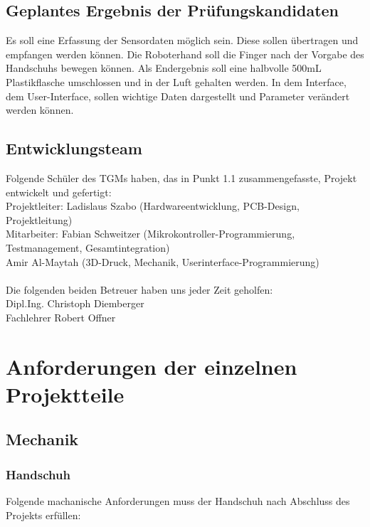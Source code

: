 \documentclass[11pt]{article}
\begin{document}
\subsection{Geplantes Ergebnis der Prüfungskandidaten}
Es soll eine Erfassung der Sensordaten möglich sein. Diese sollen übertragen und empfangen
werden können. Die Roboterhand soll die Finger nach der Vorgabe des Handschuhs bewegen
können. Als Endergebnis soll eine halbvolle 500mL Plastikflasche umschlossen und in der Luft
gehalten werden. In dem Interface, dem User-Interface, sollen wichtige Daten dargestellt und
Parameter verändert werden können.

\subsection{Entwicklungsteam}
Folgende Schüler des TGMs haben, das in Punkt 1.1 zusammengefasste, Projekt entwickelt und gefertigt: \hfill \break
\\
Projektleiter:    Ladislaus Szabo (Hardwareentwicklung, PCB-Design, Projektleitung)\\
Mitarbeiter: Fabian Schweitzer (Mikrokontroller-Programmierung, Testmanagement, Gesamtintegration)\\
Amir Al-Maytah (3D-Druck, Mechanik, Userinterface-Programmierung) 
\\
\\
Die folgenden beiden Betreuer haben uns jeder Zeit geholfen:
\\
Dipl.Ing. Christoph Diemberger \\
Fachlehrer Robert Offner

\hfill \break
\hfill \break
\hfill \break
\hfill \break
\hfill \break
\hfill \break
\hfill \break
\hfill \break


\section{Anforderungen der einzelnen Projektteile}

\subsection{Mechanik}
\subsubsection{Handschuh}
Folgende machanische Anforderungen muss der Handschuh nach Abschluss des Projekts erfüllen:
\end{document}
